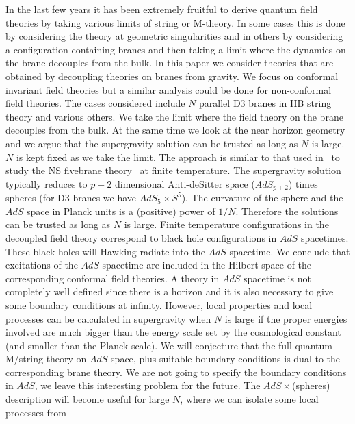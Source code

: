 
In the last few years it has been extremely fruitful to derive 
quantum field theories by taking various limits of  string or M-theory.
In some cases this is done by considering the theory  at 
geometric singularities %
and in others by considering a configuration containing branes 
and then taking a limit where the dynamics on the brane decouples 
from the bulk. %
In this paper we  consider theories that are obtained by 
decoupling  theories on  branes from gravity. 
We  focus on 
conformal invariant field theories but a similar analysis 
could be done for non-conformal field theories.
 The cases considered include 
$N$ parallel D3 branes in IIB string theory and various others.
We  take the limit where the field theory on the brane  decouples from the 
bulk. At the same time we look at the near horizon geometry 
and we argue that the supergravity solution can be trusted as long
as $N$ is large. $N$ is kept  fixed as we take the 
 limit.
The approach is similar to that used in \msfive\ to study the
NS fivebrane theory \siens\ at finite 
temperature.
The supergravity solution typically reduces to $p+2$ dimensional
Anti-deSitter space 
($AdS_{p+2}$) 
times  spheres (for D3 branes we have  $AdS_5\times S^5$).
The curvature  of the sphere and the 
$AdS$ space in Planck units
is a (positive) power of $1/N$. 
Therefore the solutions can be trusted as long as $N$ is large. 
Finite temperature configurations  in the decoupled field
theory correspond to black hole configurations in $AdS$ spacetimes.
These black holes will Hawking radiate into the $AdS$ spacetime.
We conclude that excitations of the $AdS$ spacetime 
are included in  the Hilbert space of the corresponding
conformal field theories. 
A theory in $AdS$ spacetime is not completely well defined since
there is a horizon and it is also necessary to give 
some boundary conditions at infinity. 
 However, local properties
and local processes can be calculated  in supergravity when
 $N$  is large if the proper energies
involved are much bigger than the energy scale set by the cosmological
constant (and smaller than the Planck scale).
We will conjecture that the full quantum M/string-theory on $AdS$ space,
 plus suitable 
boundary conditions is dual to  the  corresponding brane theory.
We are not going to specify the boundary conditions in $AdS$,
  we leave this interesting problem 
for the future. The $AdS \times$(spheres) description will become
useful  for large $N$, where we can isolate some local processes from
